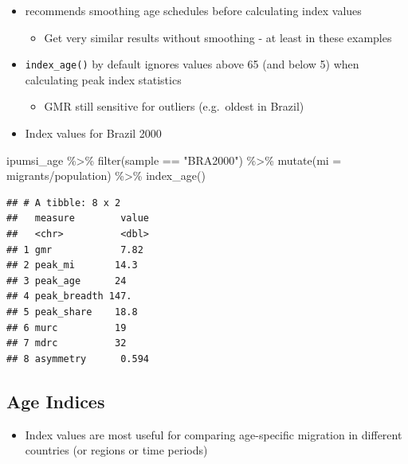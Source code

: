 \documentclass[
]{book}
\newenvironment{Shaded}{\begin{snugshade}}{\end{snugshade}}
\newcommand{\AttributeTok}[1]{\textcolor[rgb]{0.77,0.63,0.00}{#1}}
\newcommand{\FunctionTok}[1]{\textcolor[rgb]{0.00,0.00,0.00}{#1}}
\newcommand{\NormalTok}[1]{#1}
\newcommand{\SpecialCharTok}[1]{\textcolor[rgb]{0.00,0.00,0.00}{#1}}
\newcommand{\StringTok}[1]{\textcolor[rgb]{0.31,0.60,0.02}{#1}}
\providecommand{\tightlist}{%
  \setlength{\itemsep}{0pt}\setlength{\parskip}{0pt}}
\begin{document}
\begin{itemize}
\tightlist
\item
  \citet{Bernard2014} recommends smoothing age schedules before calculating index values

  \begin{itemize}
  \tightlist
  \item
    Get very similar results without smoothing - at least in these examples
  \end{itemize}
\item
  \texttt{index\_age()} by default ignores values above 65 (and below 5) when calculating peak index statistics\\

  \begin{itemize}
  \tightlist
  \item
    GMR still sensitive for outliers (e.g.~oldest in Brazil)
  \end{itemize}
\item
  Index values for Brazil 2000
\end{itemize}

\begin{Shaded}
\begin{Highlighting}[]
\NormalTok{ipumsi\_age }\SpecialCharTok{\%\textgreater{}\%}
  \FunctionTok{filter}\NormalTok{(sample }\SpecialCharTok{==} \StringTok{"BRA2000"}\NormalTok{) }\SpecialCharTok{\%\textgreater{}\%}
  \FunctionTok{mutate}\NormalTok{(}\AttributeTok{mi =}\NormalTok{ migrants}\SpecialCharTok{/}\NormalTok{population) }\SpecialCharTok{\%\textgreater{}\%}
  \FunctionTok{index\_age}\NormalTok{()}
\end{Highlighting}
\end{Shaded}

\begin{verbatim}
## # A tibble: 8 x 2
##   measure        value
##   <chr>          <dbl>
## 1 gmr            7.82 
## 2 peak_mi       14.3  
## 3 peak_age      24    
## 4 peak_breadth 147.   
## 5 peak_share    18.8  
## 6 murc          19    
## 7 mdrc          32    
## 8 asymmetry      0.594
\end{verbatim}

\hypertarget{age-indices-6}{%
\subsection{Age Indices}\label{age-indices-6}}

\begin{itemize}
\tightlist
\item
  Index values are most useful for comparing age-specific migration in different countries (or regions or time periods)
\end{itemize}
\end{document}

